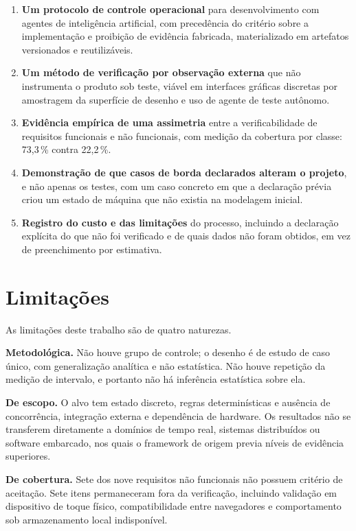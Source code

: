 \begin{enumerate}
	\item \textbf{Um protocolo de controle operacional} para desenvolvimento com
	agentes de inteligência artificial, com precedência do critério sobre a
	implementação e proibição de evidência fabricada, materializado em artefatos
	versionados e reutilizáveis.

	\item \textbf{Um método de verificação por observação externa} que não
	instrumenta o produto sob teste, viável em interfaces gráficas discretas por
	amostragem da superfície de desenho e uso de agente de teste autônomo.

	\item \textbf{Evidência empírica de uma assimetria} entre a verificabilidade
	de requisitos funcionais e não funcionais, com medição da cobertura por classe:
	73,3\,\% contra 22,2\,\%.

	\item \textbf{Demonstração de que casos de borda declarados alteram o projeto},
	e não apenas os testes, com um caso concreto em que a declaração prévia criou um
	estado de máquina que não existia na modelagem inicial.

	\item \textbf{Registro do custo e das limitações} do processo, incluindo a
	declaração explícita do que não foi verificado e de quais dados não foram
	obtidos, em vez de preenchimento por estimativa.
\end{enumerate}

\section{Limitações}
\label{sec:conc-limitacoes}

As limitações deste trabalho são de quatro naturezas.

\textbf{Metodológica.} Não houve grupo de controle; o desenho é de estudo de caso
único, com generalização analítica e não estatística. Não houve repetição da
medição de intervalo, e portanto não há inferência estatística sobre ela.

\textbf{De escopo.} O alvo tem estado discreto, regras determinísticas e ausência
de concorrência, integração externa e dependência de hardware. Os resultados não
se transferem diretamente a domínios de tempo real, sistemas distribuídos ou
software embarcado, nos quais o framework de origem previa níveis de evidência
superiores.

\textbf{De cobertura.} Sete dos nove requisitos não funcionais não possuem
critério de aceitação. Sete itens permaneceram fora da verificação, incluindo
validação em dispositivo de toque físico, compatibilidade entre navegadores e
comportamento sob armazenamento local indisponível.

